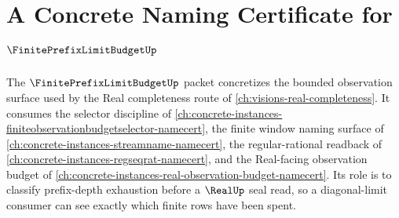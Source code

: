 \chapter{A Concrete Naming Certificate for $\FinitePrefixLimitBudgetUp$}
\label{ch:concrete-instances-finite-prefix-limit-budget-namecert}

The $\FinitePrefixLimitBudgetUp$ packet concretizes the bounded observation surface used by the Real completeness route of \autoref{ch:visions-real-completeness}. It consumes the selector discipline of \autoref{ch:concrete-instances-finiteobservationbudgetselector-namecert}, the finite window naming surface of \autoref{ch:concrete-instances-streamname-namecert}, the regular-rational readback of \autoref{ch:concrete-instances-regseqrat-namecert}, and the Real-facing observation budget of \autoref{ch:concrete-instances-real-observation-budget-namecert}. Its role is to classify prefix-depth exhaustion before a $\RealUp$ seal read, so a diagonal-limit consumer can see exactly which finite rows have been spent.



